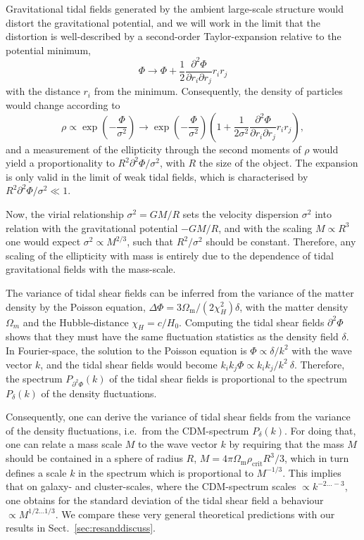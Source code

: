 \documentclass[a4paper,11pt]{article}
\begin{document}
Gravitational tidal fields generated by the ambient large-scale structure would distort the gravitational potential, and we will work in the limit that the distortion is well-described by a second-order Taylor-expansion relative to the potential minimum,
\begin{equation}
\Phi\rightarrow\Phi+\frac{1}{2}\frac{\partial^2\Phi}{\partial r_i\partial r_j}r_ir_j
\end{equation}
with the distance $r_i$ from the minimum. Consequently, the density of particles would change according to
\begin{equation}
\rho\propto\exp\left(-\frac{\Phi}{\sigma^2}\right) \rightarrow 
\exp\left(-\frac{\Phi}{\sigma^2}\right)\left(1+\frac{1}{2\sigma^2}\frac{\partial^2\Phi}{\partial r_i\partial r_j}r_ir_j\right),
\end{equation}
and a measurement of the ellipticity through the second moments of $\rho$ would yield a proportionality to $R^2\partial^2\Phi/\sigma^2$, with $R$ the size of the object. The expansion is only valid in the limit of weak tidal fields, which is characterised by $R^2\partial^2\Phi/\sigma^2\ll 1$.

Now, the virial relationship $\sigma^2 = GM/R$ sets the velocity dispersion $\sigma^2$ into relation with the gravitational potential $-GM/R$, and with the scaling $M\propto R^3$ one would expect $\sigma^2\propto M^{2/3}$, such that $R^2/\sigma^2$ should be constant. Therefore, any scaling of the ellipticity with mass is entirely due to the dependence of tidal gravitational fields with the mass-scale.

The variance of tidal shear fields can be inferred from the variance of the matter density by the Poisson equation, $\Delta\Phi = 3\Omega_\mathrm{m}/(2\chi_H^2)\delta$, with the matter density $\Omega_m$ and the Hubble-distance $\chi_H=c/H_0$. Computing the tidal shear fields $\partial^2\Phi$ shows that they must have the same fluctuation statistics as the density field $\delta$. In Fourier-space, the solution to the Poisson equation is $\Phi \propto \delta/k^2$ with the wave vector $k$, and the tidal shear fields would become $k_ik_j\Phi \propto k_ik_j/k^2\:\delta$. Therefore, the spectrum $P_{\partial^2\Phi}(k)$ of the tidal shear fields is proportional to the spectrum $P_\delta(k)$ of the density fluctuations.

Consequently, one can derive the variance of tidal shear fields from the variance of the density fluctuations, i.e.\ from the CDM-spectrum $P_\delta(k)$. For doing that, one can relate a mass scale $M$ to the wave vector $k$ by requiring that the mass $M$ should be contained in a sphere of radius $R$, $M=4\pi\Omega_\mathrm{m}\rho_\mathrm{crit}R^3/3$, which in turn defines a scale $k$ in the spectrum which is proportional to $M^{-1/3}$. This implies that on galaxy- and cluster-scales, where the CDM-spectrum scales $\propto k^{-2\ldots-3}$, one obtains for the standard deviation of the tidal shear field a behaviour $\propto M^{1/2\ldots 1/3}$. We compare these very general theoretical predictions with our results in Sect.~\ref{sec:resanddiscuss}.
\end{document}
